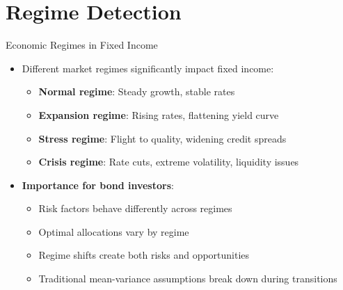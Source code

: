 \documentclass{beamer}
\begin{document}
\section{Regime Detection}

\begin{frame}{Economic Regimes in Fixed Income}
\begin{itemize}
    \item Different market regimes significantly impact fixed income:
    \begin{itemize}
        \item \textbf{Normal regime}: Steady growth, stable rates
        \item \textbf{Expansion regime}: Rising rates, flattening yield curve
        \item \textbf{Stress regime}: Flight to quality, widening credit spreads
        \item \textbf{Crisis regime}: Rate cuts, extreme volatility, liquidity issues
    \end{itemize}
    \item \textbf{Importance for bond investors}:
    \begin{itemize}
        \item Risk factors behave differently across regimes
        \item Optimal allocations vary by regime
        \item Regime shifts create both risks and opportunities
        \item Traditional mean-variance assumptions break down during transitions
    \end{itemize}
\end{itemize}
\end{frame}
\end{document}
